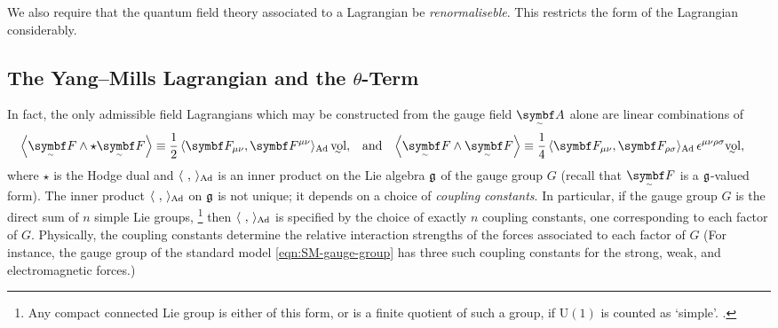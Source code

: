 We also require that the quantum field theory associated to a Lagrangian be \emph{renormaliseble}.
This restricts the form of the Lagrangian considerably.


\subsection{The Yang--Mills Lagrangian and the \texorpdfstring{$\theta$-Term}{θ-Term}}


In fact, the only admissible field Lagrangians which may be constructed from the gauge field $\tsbm A$ alone are linear combinations of
\begin{align}
	\ang{\tsbm F \wedge \star\tsbm F} &\equiv \frac12\angg{\bm F_{\mu\nu}, \bm F^{\mu\nu}}\vol
,&	&\text{and}
&	\ang{\tsbm F \wedge \tsbm F} &\equiv \frac14\angg{\bm F_{\mu\nu}, \bm F_{\rho\sigma}}\epsilon^{\mu\nu\rho\sigma}\vol
,\end{align}
where $\star$ is the Hodge dual and $\angg{\ ,\ }$ is an inner product on the Lie algebra $\frak g$ of the gauge group $G$ (recall that $\tsbm F$ is a $\frak g$-valued form).
The inner product $\angg{\ ,\ }$ on $\frak g$ is not unique; it depends on a choice of \emph{coupling constants}.
In particular, if the gauge group $G$ is the direct sum of $n$ simple Lie groups,%
\footnote{
	Any compact connected Lie group is either of this form, or is a finite quotient of such a group, if $\mathrm U(1)$ is counted as `simple'. \cite[§\,2.4.3]{Hamilton_2017}.
}
then $\angg{\ ,\ }$ is specified by the choice of exactly $n$ coupling constants, one corresponding to each factor of $G$.
Physically, the coupling constants determine the relative interaction strengths of the forces associated to each factor of $G$ \cite[§\,2.5]{Hamilton_2017}
(For instance, the gauge group of the standard model \eqref{eqn:SM-gauge-group} has three such coupling constants for the strong, weak, and electromagnetic forces.)

